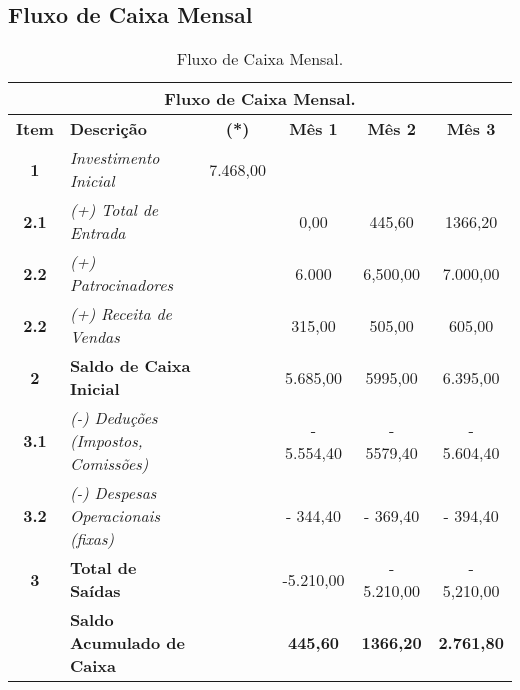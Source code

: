         
        \subsection{Fluxo de Caixa Mensal}
        
		\begin{table}[H]
			\centering
			\caption{Fluxo de Caixa Mensal.}
			
			
				\begin{tabularx}{\linewidth}{|c|X|c|c|c|c|}
					\toprule
					\multicolumn{6}{c}{\cellcolor{gray!50}\textbf{Fluxo de Caixa Mensal.}} \\
					\midrule
					\textbf{Item} & \textbf{Descrição} 						& \textbf{(*)} & \textbf{Mês 1} & \textbf{Mês 2} & \textbf{Mês 3} \\
					\midrule
					\textbf{1}   & \textit{Investimento Inicial}			& 7.468,00	& ~  		& ~ 		& ~ \\
					\textbf{2.1} & \textit{(+) Total de Entrada} 			&	~		&	0,00 	& 445,60 	& 1366,20  \\
					\textbf{2.2} & \textit{(+) Patrocinadores}				&	~		&	6.000	&	6,500,00 & 7.000,00  \\
                    \textbf{2.2} & \textit{(+) Receita de Vendas}			&	~		&	315,00	& 505,00	& 605,00	\\
                    \textbf{2} 	 & \textbf{Saldo de Caixa Inicial}			&	~		&	5.685,00& 5995,00	& 6.395,00	\\
                    \textbf{3.1} & \textit{(-) Deduções (Impostos, Comissões)} & ~  	& - 5.554,40& - 5579,40	& - 5.604,40 \\	
                    \textbf{3.2} & \textit{(-) Despesas Operacionais (fixas)} &	~		& - 344,40	& - 369,40	& - 394,40	\\
                    \textbf{3} & \textbf{Total de Saídas} 					&	~		&	-5.210,00&- 5.210,00& - 5,210,00\\	
                    \midrule
                    ~			 &   \textbf{Saldo Acumulado de Caixa} 				&	~		& \textbf{445,60}	& \textbf{1366,20}	& \textbf{2.761,80}	\\
					\bottomrule
				\end{tabularx}
			
			
			\label{tab:FluxoCaixa}
        \end{table}
